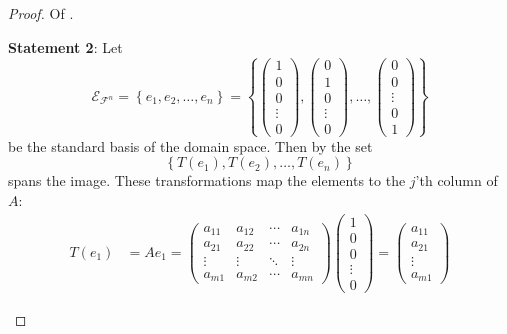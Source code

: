 \begin{proof}
	Of .
	\begin{flushleft}
		\textbf{Statement 2}: Let
		\begin{equation*}
			\mathcal{E}_{\mathcal{F}^n}=
			\left\{e_1, e_2, \dots, e_n\right\}=
			\left\{
			\begin{pmatrix}
				1 \\ 0 \\ 0 \\ \vdots \\ 0
			\end{pmatrix},
			\begin{pmatrix}
				0 \\ 1 \\ 0 \\ \vdots \\ 0
			\end{pmatrix},
			\dots,
			\begin{pmatrix}
				0 \\ 0 \\ \vdots \\ 0 \\ 1
			\end{pmatrix}
			\right\}
		\end{equation*}
		be the standard basis of the domain space. Then by 
		the set
		\begin{equation*}
			\left\{T(e_1),T(e_2),\dots,T(e_n)\right\}
		\end{equation*}
		spans the image. These transformations map the elements to the $j$'th column
		of $A$:
		\begin{align*}
			T(e_1) & =Ae_1=\begin{pmatrix}
				a_{11} & a_{12} & \cdots & a_{1n} \\
				a_{21} & a_{22} & \cdots & a_{2n} \\
				\vdots & \vdots & \ddots & \vdots \\
				a_{m1} & a_{m2} & \cdots & a_{mn}
			\end{pmatrix}\begin{pmatrix}
				1 \\ 0 \\ 0 \\ \vdots \\ 0
			\end{pmatrix}=\begin{pmatrix}
				a_{11} \\ a_{21} \\ \vdots \\ a_{m1}

\end{pmatrix}
\end{align*}
\end{flushleft}
\end{proof}
